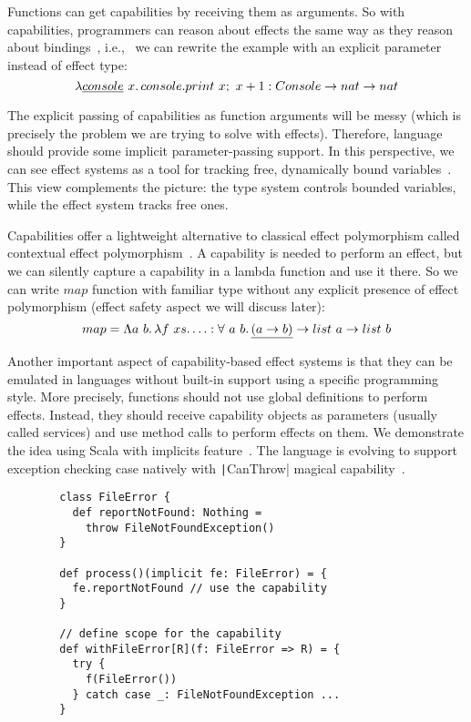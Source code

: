 \documentclass[conference]{IEEEtran}
\newcommand{\seq}{;~}
\newcommand{\ap}{~}
\begin{document}
    Functions can get capabilities by receiving them as arguments.
    So with capabilities, programmers can reason about effects the same way as they reason about bindings~\cite{brachthauser2022effects}, i.e., \ we can rewrite the example with an explicit parameter instead of effect type:
    \[\lambda \underline{console} \ap x \ldotp console.print\ap x\seq x + 1 : Console \to nat \to nat\]

    The explicit passing of capabilities as function arguments will be messy (which is precisely the problem we are trying to solve with effects).
    Therefore, language should provide some implicit parameter-passing support.
    In this perspective, we can see effect systems as a tool for tracking free, dynamically bound variables~\cite{odersky2022scoped}.
    This view complements the picture: the type system controls bounded variables, while the effect system tracks free ones.

    Capabilities offer a lightweight alternative to classical effect polymorphism called contextual effect polymorphism~\cite{brachthauser2022effects}.
    A capability is needed to perform an effect, but we can silently capture a capability in a lambda function and use it there.
    So we can write $map$ function with familiar type without any explicit presence of effect polymorphism (effect safety aspect we will discuss later):
    \[map = \Lambda a \ap b\ldotp \lambda f\ap xs\ldotp \ldots : \forall \ap a \ap b\ldotp \underline{(a \to b)} \to list \ap a \to list \ap b \]

    Another important aspect of capability-based effect systems is that they can be emulated in languages without built-in support using a specific programming style.
    More precisely, functions should not use global definitions to perform effects.
    Instead, they should receive capability objects as parameters (usually called services) and use method calls to perform effects on them.
    We demonstrate the idea using Scala with implicits feature~\cite{odersky2004scala}.
    The language is evolving to support exception checking case natively with \texttt|CanThrow| magical capability~\cite{odersky2021safer}.
    \begin{verbatim}
        class FileError {
          def reportNotFound: Nothing =
            throw FileNotFoundException()
        }

        def process()(implicit fe: FileError) = {
          fe.reportNotFound // use the capability
        }

        // define scope for the capability
        def withFileError[R](f: FileError => R) = {
          try {
            f(FileError())
          } catch case _: FileNotFoundException ...
        }
    \end{verbatim}
\end{document}

